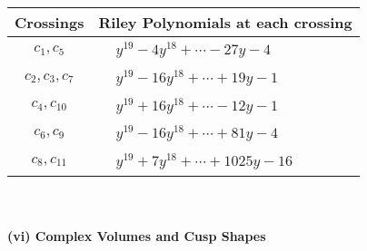 \documentclass[1p]{elsarticle_modified}
\theoremstyle{definition}
\begin{document}
\begin{tabular}{m{50pt}|m{274pt}}
Crossings & \hspace{64pt}Riley Polynomials at each crossing \\
\hline $$\begin{aligned}c_{1},c_{5}\end{aligned}$$&$\begin{aligned}
&y^{19}-4 y^{18}+\cdots-27 y-4
\end{aligned}$\\
\hline $$\begin{aligned}c_{2},c_{3},c_{7}\end{aligned}$$&$\begin{aligned}
&y^{19}-16 y^{18}+\cdots+19 y-1
\end{aligned}$\\
\hline $$\begin{aligned}c_{4},c_{10}\end{aligned}$$&$\begin{aligned}
&y^{19}+16 y^{18}+\cdots-12 y-1
\end{aligned}$\\
\hline $$\begin{aligned}c_{6},c_{9}\end{aligned}$$&$\begin{aligned}
&y^{19}-16 y^{18}+\cdots+81 y-4
\end{aligned}$\\
\hline $$\begin{aligned}c_{8},c_{11}\end{aligned}$$&$\begin{aligned}
&y^{19}+7 y^{18}+\cdots+1025 y-16
\end{aligned}$\\
\hline
\end{tabular}\\~\\
\newpage\flushleft \textbf{(vi) Complex Volumes and Cusp Shapes}
\end{document}
